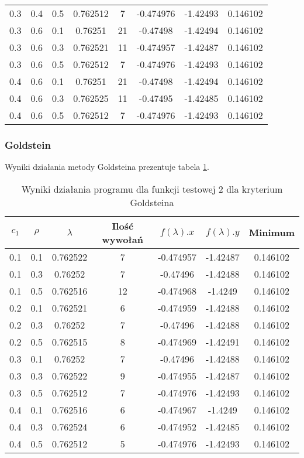 \documentclass{classrep}
\begin{document}
\begin{table}
\begin{tabular}{|c|c|c|c|c|c|c|c|}
    0.3 & 0.4 & 0.5 & 0.762512 & 7 & -0.474976 & -1.42493 & 0.146102 \\
    0.3 & 0.6 & 0.1 & 0.76251 & 21 & -0.47498 & -1.42494 & 0.146102 \\
    0.3 & 0.6 & 0.3 & 0.762521 & 11 & -0.474957 & -1.42487 & 0.146102 \\
    0.3 & 0.6 & 0.5 & 0.762512 & 7 & -0.474976 & -1.42493 & 0.146102 \\
    0.4 & 0.6 & 0.1 & 0.76251 & 21 & -0.47498 & -1.42494 & 0.146102 \\
    0.4 & 0.6 & 0.3 & 0.762525 & 11 & -0.47495 & -1.42485 & 0.146102 \\
    0.4 & 0.6 & 0.5 & 0.762512 & 7 & -0.474976 & -1.42493 & 0.146102 \\
    \hline
  \end{tabular}
\end{table}

\subsubsection{Goldstein}

Wyniki działania metody Goldsteina prezentuje tabela \ref{goldstein2}.

\begin{table}
  \centering
  \caption{Wyniki działania programu dla funkcji testowej 2 dla kryterium Goldsteina}
  \label{goldstein2}
  \begin{tabular}{|c|c|c|c|c|c|c|}
    \hline
    $c_1$ & $\rho$ & $\lambda$ & Ilość wywołań & $f(\lambda).x$ & $f(\lambda).y$ & Minimum \\
    \hline
    0.1 & 0.1 & 0.762522 & 7 & -0.474957 & -1.42487 & 0.146102 \\
    0.1 & 0.3 & 0.76252 & 7 & -0.47496 & -1.42488 & 0.146102 \\
    0.1 & 0.5 & 0.762516 & 12 & -0.474968 & -1.4249 & 0.146102 \\
    0.2 & 0.1 & 0.762521 & 6 & -0.474959 & -1.42488 & 0.146102 \\
    0.2 & 0.3 & 0.76252 & 7 & -0.47496 & -1.42488 & 0.146102 \\
    0.2 & 0.5 & 0.762515 & 8 & -0.474969 & -1.42491 & 0.146102 \\
    0.3 & 0.1 & 0.76252 & 7 & -0.47496 & -1.42488 & 0.146102 \\
    0.3 & 0.3 & 0.762522 & 9 & -0.474955 & -1.42487 & 0.146102 \\
    0.3 & 0.5 & 0.762512 & 7 & -0.474976 & -1.42493 & 0.146102 \\
    0.4 & 0.1 & 0.762516 & 6 & -0.474967 & -1.4249 & 0.146102 \\
    0.4 & 0.3 & 0.762524 & 6 & -0.474952 & -1.42485 & 0.146102 \\
    0.4 & 0.5 & 0.762512 & 5 & -0.474976 & -1.42493 & 0.146102 \\
    \hline
  \end{tabular}
\end{table}
\end{document}
